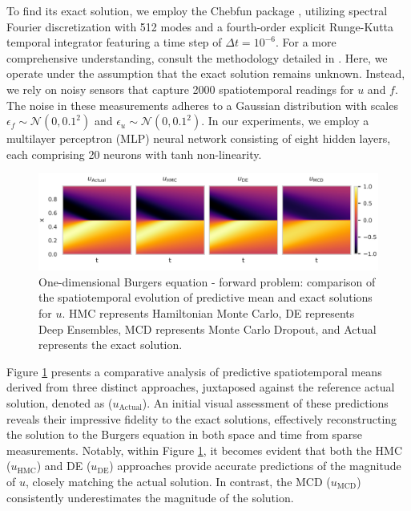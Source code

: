\documentclass{article}
\begin{document}
To find its exact solution, we employ the Chebfun package \citep{rico1994continuous}, utilizing spectral Fourier discretization with 512 modes and a fourth-order explicit Runge-Kutta temporal integrator featuring a time step of $\Delta t=10^{-6}$. 
 For a more comprehensive understanding, consult the methodology detailed in \citep{raissi2019physics}.
Here, we operate under the assumption that the exact solution remains unknown.
Instead, we rely on noisy sensors that capture 2000 spatiotemporal readings for $u$ and $f$. 
The noise in these measurements adheres to a Gaussian distribution with scales $\epsilon_f \sim \mathcal{N}(0, 0.1^2)$ and $\epsilon_u \sim \mathcal{N}(0, 0.1^2)$. 
In our experiments, we employ a multilayer perceptron (MLP) neural network consisting of eight hidden layers, each comprising 20 neurons with tanh non-linearity.
%
\begin{figure}[H]
\includegraphics[width=\linewidth]{images/Burgers_velocity_comparision_23_1.pdf}
\caption{One-dimensional Burgers equation - forward problem: comparison of the spatiotemporal evolution of predictive mean and exact solutions for $u$. HMC represents Hamiltonian Monte Carlo, DE represents Deep Ensembles, MCD represents Monte Carlo Dropout, and Actual represents the exact solution.}
\label{fig:heat-map}
\end{figure}
%
Figure \ref{fig:heat-map} presents a comparative analysis of predictive spatiotemporal means derived from three distinct approaches, juxtaposed against the reference actual solution, denoted as ($u_{\mathrm{Actual}}$).
An initial visual assessment of these predictions reveals their impressive fidelity to the exact solutions, effectively reconstructing the solution to the Burgers equation in both space and time from sparse measurements.
Notably, within Figure \ref{fig:heat-map}, it becomes evident that both the HMC ($u_{\mathrm{HMC}}$) and DE ($u_{\mathrm{DE}}$) approaches provide accurate predictions of the magnitude of $u$, closely matching the actual solution. In contrast, the MCD ($u_{\mathrm{MCD}}$) consistently underestimates the magnitude of the solution.
\end{document}
